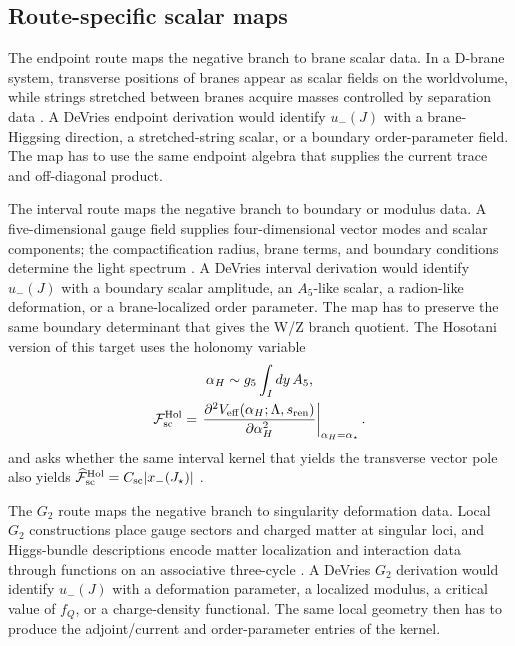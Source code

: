 \subsection{Route-specific scalar maps}
\label{sec:route-specific-scalar-maps}

The endpoint route maps the negative branch to brane scalar data.  In a D-brane system, transverse positions of branes appear as scalar fields on the worldvolume, while strings stretched between branes acquire masses controlled by separation data \cite{TongString,Polchinski1994}.  A DeVries endpoint derivation would identify \(u_-(J)\) with a brane-Higgsing direction, a stretched-string scalar, or a boundary order-parameter field.  The map has to use the same endpoint algebra that supplies the current trace and off-diagonal product.

The interval route maps the negative branch to boundary or modulus data.  A five-dimensional gauge field supplies four-dimensional vector modes and scalar components; the compactification radius, brane terms, and boundary conditions determine the light spectrum \cite{CsakiHubiszMeade2005,WittenKK1981}.  A DeVries interval derivation would identify \(u_-(J)\) with a boundary scalar amplitude, an \(A_5\)-like scalar, a radion-like deformation, or a brane-localized order parameter.  The map has to preserve the same boundary determinant that gives the W/Z branch quotient.  The Hosotani version of this target uses the holonomy variable
\begin{equation}
  \begin{gathered}
  \alpha_H \sim g_5\int_I dy\,A_5,\\
  \mathcal F_{\rm sc}^{\rm Hol}
  =
  \left.
  \frac{\partial^2 V_{\rm eff}(\alpha_H;\Lambda,s_{\rm ren})}
       {\partial\alpha_H^2}
  \right|_{\alpha_H=\alpha_\star}.
  \end{gathered}
  \label{eq:hosotani-scalar-functional}
\end{equation}
and asks whether the same interval kernel that yields the transverse vector pole
also yields
\(\widehat{\mathcal F}_{\rm sc}^{\rm Hol}
=C_{\rm sc}|x_-(J_\star)|\) \cite{Hosotani1983,HabaOda2011,Bucci2004}.

The \(G_2\) route maps the negative branch to singularity deformation data.  Local \(G_2\) constructions place gauge sectors and charged matter at singular loci, and Higgs-bundle descriptions encode matter localization and interaction data through functions on an associative three-cycle \cite{AcharyaWitten2001,AcharyaGukov2004,BraunEtAl2019}.  A DeVries \(G_2\) derivation would identify \(u_-(J)\) with a deformation parameter, a localized modulus, a critical value of \(f_Q\), or a charge-density functional.  The same local geometry then has to produce the adjoint/current and order-parameter entries of the kernel.

